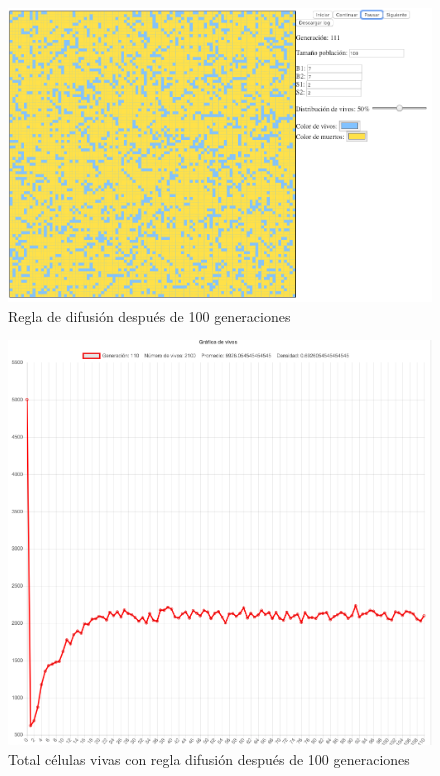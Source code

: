 	\begin{figure}[H]
		\begin{center}
			\includegraphics[scale=.3]{GOL/img/difusion1.png}
			\caption{Regla de difusión después de 100 generaciones}
			\label{fig:gol5}
		\end{center}
	\end{figure}

	\begin{figure}[H]
		\begin{center}
			\includegraphics[scale=.24]{GOL/img/difusion2.png}
			\caption{Total células vivas con regla difusión después de 100 generaciones}
			\label{fig:gol5}
		\end{center}
	\end{figure}

